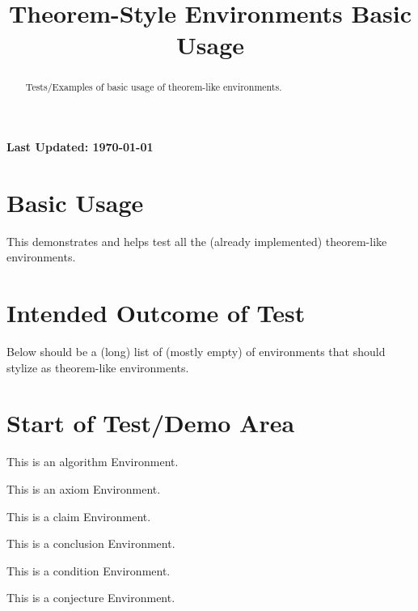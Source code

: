 \documentclass{ximera}
\title{Theorem-Style Environments Basic Usage}
\begin{document}
\begin{abstract}
    Tests/Examples of basic usage of theorem-like environments.
\end{abstract}
\maketitle

{{\Huge \bfseries Last Updated: \today}} \\

\section{Basic Usage}
This demonstrates and helps test all the (already implemented) theorem-like environments.

\section{Intended Outcome of Test}
Below should be a (long) list of (mostly empty) of environments that should stylize as theorem-like environments.

\section{Start of Test/Demo Area}
\begin{algorithm}
    This is an algorithm Environment.
\end{algorithm}%

\begin{axiom}
    This is an axiom Environment.
\end{axiom}%

\begin{claim}
    This is a claim Environment.
\end{claim}%

\begin{conclusion}
    This is a conclusion Environment.
\end{conclusion}%

\begin{condition}
    This is a condition Environment.
\end{condition}%

\begin{conjecture}
    This is a conjecture Environment.
\end{conjecture}%
\end{document}

